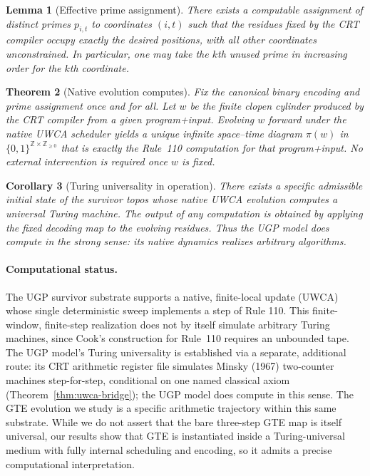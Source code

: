 \documentclass[12pt]{article}
\newtheorem{theorem}{Theorem}[section]
\newtheorem{lemma}[theorem]{Lemma}
\newtheorem{corollary}[theorem]{Corollary}
\numberwithin{equation}{section}
\begin{document}
\begin{lemma}[Effective prime assignment]
There exists a computable assignment of distinct primes $p_{i,t}$ to coordinates $(i,t)$ such that the residues fixed by the CRT compiler occupy exactly the desired positions, with all other coordinates unconstrained. In particular, one may take the $k$th unused prime in increasing order for the $k$th coordinate.
\end{lemma}



\begin{theorem}[Native evolution computes]\label{thm:uwca-doescompute}
Fix the canonical binary encoding and prime assignment once and for all. Let $w$ be the finite clopen cylinder produced by the CRT compiler from a given program+input. Evolving $w$ forward under the native UWCA scheduler yields a unique infinite space--time diagram $\pi(w)$ in $\{0,1\}^{\mathbb{Z}\times\mathbb{Z}_{\ge 0}}$ that is exactly the Rule~110 computation for that program+input. No external intervention is required once $w$ is fixed.
\end{theorem}

\begin{corollary}[Turing universality in operation]
There exists a specific admissible initial state of the survivor topos whose native UWCA evolution computes a universal Turing machine. The output of any computation is obtained by applying the fixed decoding map to the evolving residues. Thus the UGP model \emph{does} compute in the strong sense: its native dynamics realizes arbitrary algorithms.
\end{corollary}

\paragraph{Computational status.}
The UGP survivor substrate supports a native, finite-local update (UWCA) whose single deterministic sweep implements a step of Rule 110. This finite-window, finite-step realization does not by itself simulate arbitrary Turing machines, since Cook's construction for Rule~110 requires an unbounded tape. The UGP model's Turing universality is established via a separate, additional route: its CRT arithmetic register file simulates Minsky (1967) two-counter machines step-for-step, conditional on one named classical axiom (Theorem~\ref{thm:uwca-bridge}); the UGP model does compute in this sense. The GTE evolution we study is a specific arithmetic trajectory within this same substrate. While we do not assert that the bare three-step GTE map is itself universal, our results show that GTE is instantiated inside a Turing-universal medium with fully internal scheduling and encoding, so it admits a precise computational interpretation.
\end{document}
